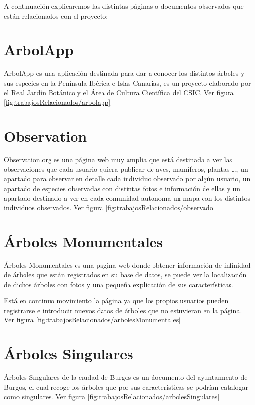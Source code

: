 
A continuación explicaremos las distintas páginas o documentos observados que están relacionados con el proyecto: 

\section{ArbolApp}

ArbolApp \cite{ArbolApp} es una aplicación destinada para dar a conocer los distintos árboles y sus especies en la Península Ibérica e Islas Canarias, es un proyecto elaborado por el Real Jardín Botánico y el Área de Cultura Científica del CSIC.
Ver figura \ref{fig:trabajosRelacionados/arbolapp}

\section{Observation}

Observation.org \cite{Observation} es una página web muy amplia que está destinada a ver las observaciones que cada usuario quiera publicar de aves, mamíferos, plantas \ldots, un apartado para observar en detalle cada individuo observado por algún usuario, un apartado de especies observadas con distintas fotos e información de ellas y un apartado destinado a ver en cada comunidad autónoma un mapa con los distintos individuos observados.
Ver figura \ref{fig:trabajosRelacionados/observado}

\section{Árboles Monumentales}

Árboles Monumentales \cite{arbolesMonumentales} es una página web donde obtener información de infinidad de árboles que están registrados en su base de datos, se puede ver la localización de dichos árboles con fotos y una pequeña explicación de sus características.

Está en continuo movimiento la página ya que los propios usuarios pueden registrarse e introducir nuevos datos de árboles que no estuvieran en la página.
Ver figura \ref{fig:trabajosRelacionados/arbolesMonumentales}

\section{Árboles Singulares}

Árboles Singulares de la ciudad de Burgos \cite{arbolesSingulares} es un documento del ayuntamiento de Burgos, el cual recoge los árboles que por sus características se podrían catalogar como singulares. Ver figura \ref{fig:trabajosRelacionados/arbolesSingulares}
